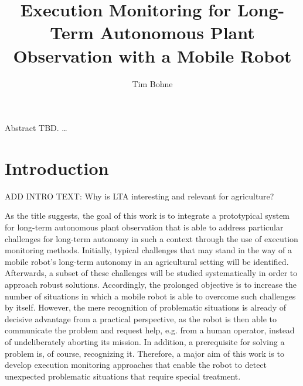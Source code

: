 \documentclass[english, master, utf8]{base/thesis_KBS}
\begin{document}
\title{Execution Monitoring for Long-Term Autonomous Plant Observation with a Mobile Robot}
\author{Tim Bohne}

\generatetitle

\cleardoublepage

\begin{prefacesection}{Abstract}
TBD. \dots
\end{prefacesection}

\cleardoublepage
\tableofcontents

\startTextChapters %

\chapter{Introduction}

ADD INTRO TEXT: Why is LTA interesting and relevant for agriculture?\newline

As the title suggests, the goal of this work is to integrate a prototypical system for long-term autonomous plant observation that is able to address 
particular challenges for long-term autonomy in such a context through the use of execution monitoring methods. Initially, typical challenges that may stand in the way of a mobile
robot's long-term autonomy in an agricultural setting will be identified. Afterwards, a subset of these challenges will be studied systematically in order to 
approach robust solutions. Accordingly, the prolonged objective is to increase the number of situations in which a mobile robot is able to 
overcome such challenges by itself. However, the mere recognition of problematic situations is already of decisive advantage from a practical perspective,
as the robot is then able to communicate the problem and request help, e.g. from a human operator, instead of undeliberately aborting its mission.
In addition, a prerequisite for solving a problem is, of course, recognizing it. Therefore, a major aim of this work is to develop execution monitoring
approaches that enable the robot to detect unexpected problematic situations that require special treatment.\newline
\end{document}
